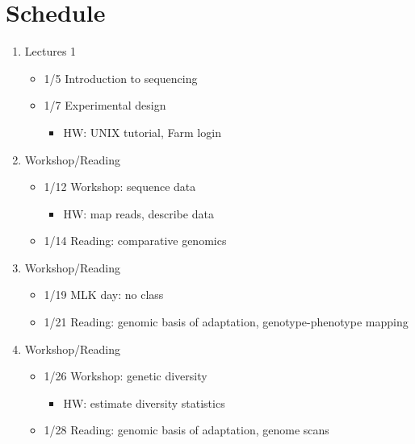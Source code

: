 \documentclass[]{article}
\begin{document}
\section*{Schedule}
\begin{enumerate}

\item Lectures 1
\begin{itemize}
\item 1/5 Introduction to sequencing 
\item 1/7 Experimental design 
	\begin{itemize}
	\item HW: UNIX tutorial, Farm login
	\end{itemize}
\end{itemize}

\item Workshop/Reading
	\begin{itemize}
	\item 1/12 Workshop: sequence data
		\begin{itemize}
		\item HW: map reads, describe data
		\end{itemize}
	\item 1/14 Reading: comparative genomics
\end{itemize}

\item Workshop/Reading
	\begin{itemize}
	\item 1/19 MLK day: no class
	\item 1/21 Reading: genomic basis of adaptation, genotype-phenotype mapping
\end{itemize}

\item Workshop/Reading
	\begin{itemize}
	\item 1/26 Workshop: genetic diversity
		\begin{itemize}
		\item HW: estimate diversity statistics		\end{itemize}
	\item 1/28 Reading: genomic basis of adaptation, genome scans
\end{itemize}


\end{enumerate}
\end{document}

